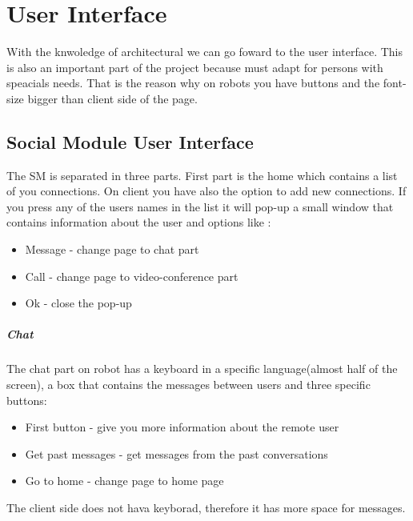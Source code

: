 \chapter{User Interface}
\label{chapter:user-interface}
With the knwoledge of architectural we can go foward to the user interface. This is also
an important part of the project because must adapt for persons with speacials needs.
That is the reason why on robots you have buttons and the font-size bigger than client
side of the page.


\section{Social Module User Interface}
\label{sec:ui-callapp}
The SM is separated in three parts. First part is the home which contains a list
of you connections. On client you have also the option to add new connections. If you
press any of the users names in the list it will pop-up a small window that contains
information about the user and options like :

\begin{itemize}
  \item Message - change page to chat part
  \item Call - change page to video-conference part
  \item Ok - close the pop-up
\end{itemize}

\paragraph{Chat}
\label{sub-sec:ui-callapp-message} 
The chat part on robot has a keyboard in a specific language(almost half of the screen),
a box that contains the messages between users and three specific buttons:
\begin{itemize}
  \item First button - give you more information about the remote user
  \item Get past messages - get messages from the past conversations
  \item Go to home - change page to home page
\end{itemize}
The client side does not hava keyborad, therefore it has more space for messages.

